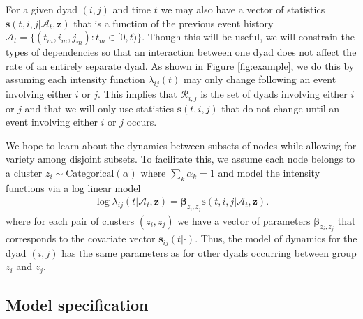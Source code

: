 \documentclass[11pt]{article}
\begin{document}
For a given dyad $(i,j)$ and time $t$ we may also have a vector of statistics $\mathbf{s}(t,i,j|\mathcal{A}_t,\mathbf{z})$ that is a function of the previous event history  $\mathcal{A}_t = \{(t_m,i_m,j_m): t_m \in [0,t)\}$.   Though this will be useful, we will constrain the types of dependencies so that an interaction between one dyad does not affect the rate of an entirely separate dyad.  As shown in Figure \ref{fig:example}, we do this by assuming each intensity function $\lambda_{ij}(t)$ may only change following an event involving either $i$ or $j$.  This implies that  $\mathcal{R}_{i,j}$ is the set of dyads involving either $i$ or $j$ and that we will only use  statistics $\mathbf{s}(t,i,j)$ that do not change until an event involving either $i$ or $j$ occurs.  

We hope to learn about the dynamics between subsets of nodes while allowing for variety among disjoint subsets.   To facilitate this, we assume each node belongs to a cluster $z_i \sim \mbox{Categorical}(\alpha)$ where $\sum_k \alpha_k = 1$ and  model the intensity functions via a log linear model
\begin{align}
\log \lambda_{ij}(t | \mathcal{A}_t,\mathbf{z}) = \boldsymbol{\beta}_{z_i,z_j} \mathbf{s}(t,i,j|\mathcal{A}_t,\mathbf{z}).
\end{align}
where for each pair of clusters $(z_i,z_j)$ we have a vector of parameters $\boldsymbol{\beta}_{z_i,z_j}$ that corresponds to the covariate vector $\mathbf{s}_{ij}(t|\cdot)$.   Thus, the model of dynamics for the dyad $(i,j)$ has the same parameters as for other dyads occurring between group $z_i$ and $z_j$. 

\subsection{Model specification}
\end{document}
